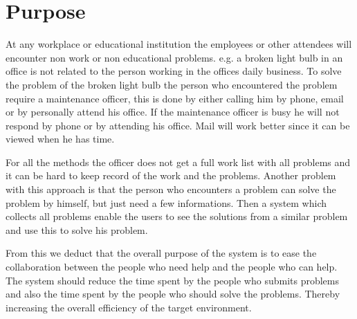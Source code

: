 \newcommand{\lightbulb}{light bulb}
\section{Purpose}
At any workplace or educational institution the employees or other attendees will encounter non work or non educational problems. 
e.g. a broken \lightbulb{} in an office is not related to the person working in the offices daily business. 
To solve the problem of the broken \lightbulb{} the person who encountered the problem require a maintenance officer, this is done by either calling him by phone, email or by personally attend his office. 
If the maintenance officer is busy he will not respond by phone or by attending his office. Mail will work better since it can be viewed when he has time.

For all the methods the officer does not get a full work list with all problems and it can be hard to keep record of the work and the problems.
Another problem with this approach is that the person who encounters a problem can solve the problem by himself, but just need a few informations. Then a system which collects all problems enable the users to see the solutions from a similar problem and use this to solve his problem.

From this we deduct that the overall purpose of the system is to ease the collaboration between the people who need help and the people who can help.
The system should reduce the time spent by the people who submits problems and also the time spent by the people who should solve the problems.
Thereby increasing the overall efficiency of the target environment. 

